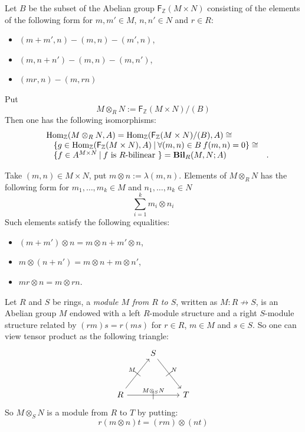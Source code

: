 \documentclass[8pt]{article}
\theoremstyle{definition}
\theoremstyle{definition}
\theoremstyle{definition}
\theoremstyle{definition}
\theoremstyle{definition}
\theoremstyle{definition}
\theoremstyle{definition}
\theoremstyle{definition}
\theoremstyle{definition}
\theoremstyle{definition}
\theoremstyle{definition}
\theoremstyle{definition}
\theoremstyle{definition}
\theoremstyle{definition}
\theoremstyle{question}
\begin{document}
Let $B$ be the subset of the Abelian group $\mathsf{F}_{\mathbb{Z}}(M \times N)$ consisting of the elements of the 
following form for $m, m' \in M$, $n, n' \in N$ and $r \in R$: 
\begin{itemize}
  \item $(m + m', n) - (m, n) - (m', n)$,
  \item $(m, n + n') - (m, n) - (m, n')$,
  \item $(mr, n) - (m, rn)$
\end{itemize}
Put
\[
M \otimes_R N := \mathsf{F}_{\mathbb{Z}}(M \times N)/(B)
\]
Then one has the following isomorphisms:
\[
\begin{array}{lll}
  & \operatorname{Hom}_{\mathbb{Z}}(M \otimes_R N, A) = \operatorname{Hom}_{\mathbb{Z}}(\mathsf{F}_{\mathbb{Z}}(M \times N)/(B), A) \cong & \\
  & \:\:\:\: \{ g \in \operatorname{Hom}_{\mathbb{Z}}(\mathsf{F}_{\mathbb{Z}}(M \times N), A) \: | \: \forall (m, n) \in B \: f(m,n) = 0\} \cong & \\
  & \:\:\:\: \{ f \in A^{M \times N} \: | \: \text{$f$ is $R$-bilinear }\} = {\bf Bil}_R(M, N; A)&. 
\end{array}
\]

Take $(m, n) \in M \times N$, put $m \otimes n := \lambda(m, n)$. Elements of $M \otimes_R N$ has the following form
for $m_1, \ldots, m_k \in M$ and $n_1, \ldots, n_k \in N$
\[
\sum \limits_{i = 1}^k m_i \otimes n_i
\]
Such elements satisfy the following equalities:
\begin{itemize}
  \item $(m + m') \otimes n = m \otimes n + m' \otimes n$,
  \item $m \otimes (n + n') = m \otimes n + m \otimes n'$,
  \item $mr \otimes n = m \otimes r n$.
\end{itemize}

Let $R$ and $S$ be rings, a \emph{module $M$ from $R$ to $S$}, written as $M : R \not\to S$, is 
an Abelian group $M$ endowed with a left $R$-module structure and a right $S$-module structure related by
$(rm)s = r(m s)$
for $r \in R$, $m \in M$ and $s \in S$. So one can view tensor product as the following triangle:
\[
\begin{tikzcd}
  & S \ar[ddr,  "|" marking, "N"] \\
  \\
  R \ar[uur, "|" marking, "M"] \ar[rr,  "|" marking, "M \otimes_S N"] && T
\end{tikzcd}
\]
So $M \otimes_S N$ is a module from $R$ to $T$ by putting:
\[
r(m \otimes n)t = (rm) \otimes (nt)
\]
\end{document}
